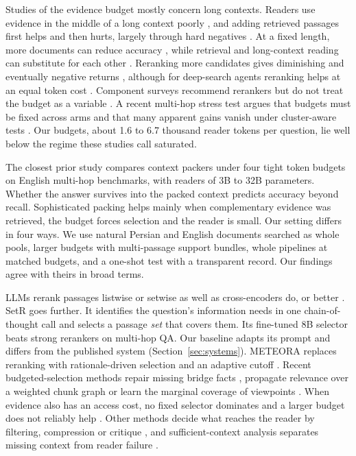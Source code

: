 Studies of the evidence budget mostly concern long contexts. Readers use evidence in the middle of a long context poorly \citep{liu2024lost}, and adding retrieved passages first helps and then hurts, largely through hard negatives \citep{jin2025longcontext,leng2024longcontext}. At a fixed length, more documents can reduce accuracy \citep{levy2025moredocs}, while retrieval and long-context reading can substitute for each other \citep{xu2024retrieval,li2024selfroute}. Reranking more candidates gives diminishing and eventually negative returns \citep{jacob2024drowning}, although for deep-search agents reranking helps at an equal token cost \citep{sharify2026rerank}. Component surveys recommend rerankers but do not treat the budget as a variable \citep{wang2024bestpractices}. A recent multi-hop stress test argues that budgets must be fixed across arms and that many apparent gains vanish under cluster-aware tests \citep{chacon2026fixedbudget}. Our budgets, about 1.6 to 6.7 thousand reader tokens per question, lie well below the regime these studies call saturated.

The closest prior study \citep{bala2026recall} compares context packers under four tight token budgets on English multi-hop benchmarks, with readers of 3B to 32B parameters. Whether the answer survives into the packed context predicts accuracy beyond recall. Sophisticated packing helps mainly when complementary evidence was retrieved, the budget forces selection and the reader is small. Our setting differs in four ways. We use natural Persian and English documents searched as whole pools, larger budgets with multi-passage support bundles, whole pipelines at matched budgets, and a one-shot test with a transparent record. Our findings agree with theirs in broad terms.

LLMs rerank passages listwise or setwise as well as cross-encoders do, or better \citep{sun2023rankgpt,pradeep2023rankzephyr,zhuang2024setwise}. SetR \citep{lee2025setr} goes further. It identifies the question's information needs in one chain-of-thought call and selects a passage \emph{set} that covers them. Its fine-tuned 8B selector beats strong rerankers on multi-hop QA. Our \setr{} baseline adapts its prompt and differs from the published system (Section~\ref{sec:systems}). METEORA replaces reranking with rationale-driven selection and an adaptive cutoff \citep{saxena2025meteora}. Recent budgeted-selection methods repair missing bridge facts \citep{guo2026adagate}, propagate relevance over a weighted chunk graph \citep{sahinoglu2026spectrag} or learn the marginal coverage of viewpoints \citep{duan2026lmvu}. When evidence also has an access cost, no fixed selector dominates and a larger budget does not reliably help \citep{wu2026costaware}. Other methods decide what reaches the reader by filtering, compression or critique \citep{wang2023filco,xu2024recomp,jiang2024longllmlingua,asai2024selfrag,yan2024crag}, and sufficient-context analysis separates missing context from reader failure \citep{joren2025sufficient}.

